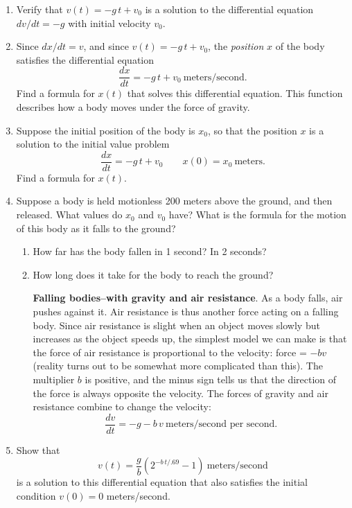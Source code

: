 \begin{enumerate}
\item Verify that $v(t) = -g\,t + v_0$\label{falling body0} is a
solution to the differential equation $dv/dt = -g$ with initial
velocity $v_0$.


\item Since $dx/dt = v$, and since $v(t) = -g\,t + v_0$, the {\em position\/} $x$ of the body satisfies the differential equation
	\[
\dfrac{dx}{dt} = -g\,t + v_0 \ \mbox{meters/second}.
\]
Find a formula for $x(t)$ that solves this differential equation.  This function describes how a body moves under the force of gravity.


\item Suppose the initial position of the body is $x_0$, so that the position $x$ is a solution to the initial value problem
	\[
\dfrac{dx}{dt} = -g\,t + v_0 \qquad x(0) = x_0 \ 
		\mbox{meters}.
\]
Find a formula for $x(t)$.


\item Suppose a body is held motionless 200 meters above the ground, and then released.  What values do $x_0$ and $v_0$ have?  What is the formula for the motion of this body as it falls to the ground?

  \begin{enumerate}
  \item How far has the body fallen in 1 second?  In 2 seconds?

  \item How long does it take for the body to reach the ground?



\label{fall w/air-begin}


{\bf Falling bodies--with gravity and air resistance}.\index{air
  resistance} As a body falls, air pushes against it.  Air resistance
is thus another force acting on a falling body.  Since air resistance
is slight when an object moves slowly but increases as the object
speeds up, the simplest model we can make is that the force of air
resistance is proportional to the velocity: force = $-bv$ (reality
turns out to be somewhat more complicated than this).  The multiplier
$b$ is positive, and the minus sign tells us that the direction of the
force is always opposite the velocity.  The forces of gravity and air
resistance combine to change the velocity:
\[
\dfrac{dv}{dt} = -g - b\,v \ \mbox{meters/second per second}.
\]


\end{enumerate}
\item \label{ex:falling body1}  Show that
	\[
v(t) = \dfrac{g}{b}\left(2^{-b\,t/.69} - 1\right) 
		\ \mbox{meters/second}
\]
is a solution to this differential equation that also satisfies the initial condition $v(0) = 0$ meters/second.




\end{enumerate}
